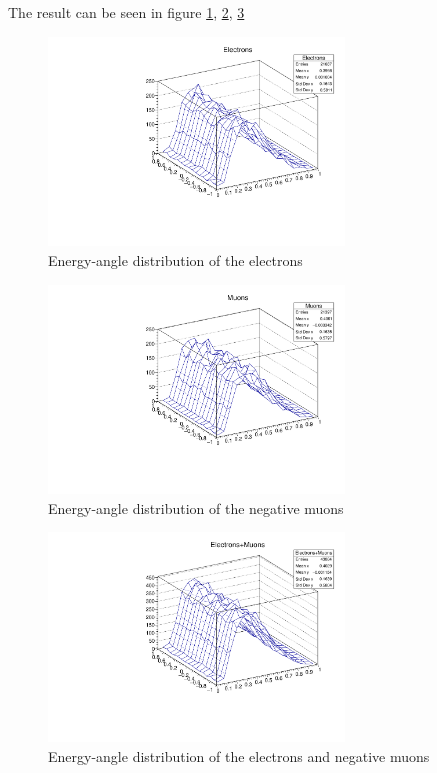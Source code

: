 The result can be seen in figure \ref{02_Electrons}, \ref{02_Muons}, \ref{02_Electrons+muons}

\begin{figure} [ht!]
  \centering
  \includegraphics[width=0.7\textwidth]{02_Electrons.pdf}
 \caption{Energy-angle distribution of the electrons}
 \label{02_Electrons}
\end{figure}

\begin{figure} [ht!]
  \centering
  \includegraphics[width=0.7\textwidth]{02_Muons.pdf}
 \caption{Energy-angle distribution of the negative muons}
 \label{02_Muons}
\end{figure}

\begin{figure} [ht!]
  \centering
  \includegraphics[width=0.7\textwidth]{02_Electrons+muons.pdf}
 \caption{Energy-angle distribution of the electrons and negative muons}
 \label{02_Electrons+muons}
\end{figure}

